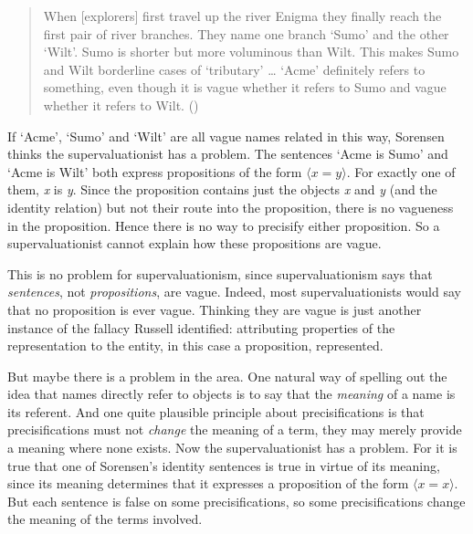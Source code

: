 \documentclass[
  11pt,
  letterpaper,
  DIV=11,
  numbers=noendperiod,
  oneside]{scrartcl}
\begin{document}
\begin{quote}
When {[}explorers{]} first travel up the river Enigma they finally reach
the first pair of river branches. They name one branch `Sumo' and the
other `Wilt'. Sumo is shorter but more voluminous than Wilt. This makes
Sumo and Wilt borderline cases of `tributary' \ldots{} `Acme' definitely
refers to something, even though it is vague whether it refers to Sumo
and vague whether it refers to Wilt.
()
\end{quote}

If `Acme', `Sumo' and `Wilt' are all vague names related in this way,
Sorensen thinks the supervaluationist has a problem. The sentences `Acme
is Sumo' and `Acme is Wilt' both express propositions of the form
\(\langle x = y \rangle\). For exactly one of them, \emph{x} is
\emph{y}. Since the proposition contains just the objects \emph{x} and
\emph{y} (and the identity relation) but not their route into the
proposition, there is no vagueness in the proposition. Hence there is no
way to precisify either proposition. So a supervaluationist cannot
explain how these propositions are vague.

This is no problem for supervaluationism, since supervaluationism says
that \emph{sentences}, not \emph{propositions}, are vague. Indeed, most
supervaluationists would say that no proposition is ever vague. Thinking
they are vague is just another instance of the fallacy Russell
identified: attributing properties of the representation to the entity,
in this case a proposition, represented.

But maybe there is a problem in the area. One natural way of spelling
out the idea that names directly refer to objects is to say that the
\emph{meaning} of a name is its referent. And one quite plausible
principle about precisifications is that precisifications must not
\emph{change} the meaning of a term, they may merely provide a meaning
where none exists. Now the supervaluationist has a problem. For it is
true that one of Sorensen's identity sentences is true in virtue of its
meaning, since its meaning determines that it expresses a proposition of
the form \(\langle x = x \rangle\). But each sentence is false on some
precisifications, so some precisifications change the meaning of the
terms involved.
\end{document}
